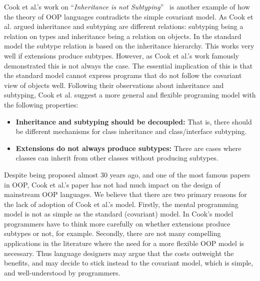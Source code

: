 Cook et al.'s work on ``\emph{Inheritance is not Subtyping}''~\cite{}
is another example of how the theory of  OOP languages contradicts 
the simple covariant model. As Cook et al. argued inheritance and
subtyping are different relations: subtyping being a relation on types 
and inheritance being a relation on objects. In the standard model 
the subtype relation is based on the inheritance hierarchy. This 
works very well if extensions produce 
subtypes. However, as Cook et al.'s work famously demonstrated 
this is not always the case. The essential implication of this is that
the standard model cannot express programs that do not follow the 
covariant view of objects well. Following their observations about 
inheritance and subtyping, Cook et al. suggest a more general and 
flexible programing model with the following properties:

\begin{itemize}

\item {\bf Inheritance and subtyping should be decoupled:} 
That is, there should be different mechanisms for class inheritance 
and class/interface subtyping. 

\item {\bf Extensions do not always produce subtypes:} 
There are cases where classes can inherit from other classes without 
producing subtypes. 

\end{itemize}

Despite being proposed almost 30 years ago, and one of the most
famous papers in OOP, Cook et al.'s paper has not had much impact 
on the design of mainstream OOP languages. 
We believe that there are two primary reasons for the lack of adoption
of Cook et al.'s model.  Firstly, the mental programming model is not
as simple as the standard (covariant) model. In Cook's model programmers have to
think more carefully on whether extensions produce subtypes or not,
for example.  Secondly, there are not many compelling applications in
the literature where the need for a more flexible OOP model is
necessary. Thus language designers may argue that the costs outweight 
the benefits, and may decide to stick instead to the covariant 
model, which is simple, and well-understood by programmers. 


